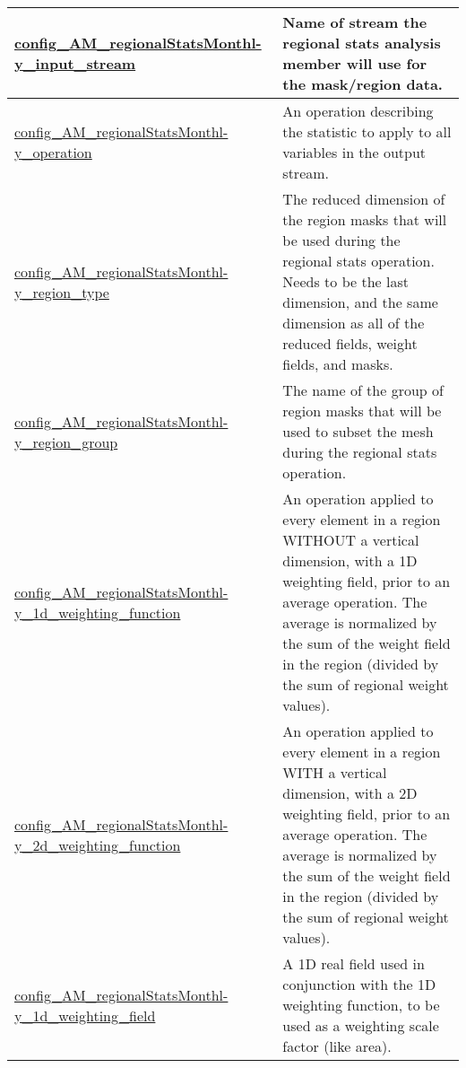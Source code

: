 {\begin{center}
\begin{longtable}{| p{2.0in} || p{4.0in} |}
    \hline
    \hyperref[subsec:nm_sec_config_AM_regionalStatsMonthly_input_stream]{config\_AM\_regionalStatsMonthl-}\hyperref[subsec:nm_sec_config_AM_regionalStatsMonthly_input_stream]{y\_input\_stream}& Name of stream the regional stats analysis member will use for the mask/region data. \\
    \hline
    \hyperref[subsec:nm_sec_config_AM_regionalStatsMonthly_operation]{config\_AM\_regionalStatsMonthl-}\hyperref[subsec:nm_sec_config_AM_regionalStatsMonthly_operation]{y\_operation}& An operation describing the statistic to apply to all variables in the output stream. \\
    \hline
    \hyperref[subsec:nm_sec_config_AM_regionalStatsMonthly_region_type]{config\_AM\_regionalStatsMonthl-}\hyperref[subsec:nm_sec_config_AM_regionalStatsMonthly_region_type]{y\_region\_type}& The reduced dimension of the region masks that will be used during the regional stats operation. Needs to be the last dimension, and the same dimension as all of the reduced fields, weight fields, and masks. \\
    \hline
    \hyperref[subsec:nm_sec_config_AM_regionalStatsMonthly_region_group]{config\_AM\_regionalStatsMonthl-}\hyperref[subsec:nm_sec_config_AM_regionalStatsMonthly_region_group]{y\_region\_group}& The name of the group of region masks that will be used to subset the mesh during the regional stats operation. \\
    \hline
    \hyperref[subsec:nm_sec_config_AM_regionalStatsMonthly_1d_weighting_function]{config\_AM\_regionalStatsMonthl-}\hyperref[subsec:nm_sec_config_AM_regionalStatsMonthly_1d_weighting_function]{y\_1d\_weighting\_function}& An operation applied to every element in a region WITHOUT a vertical dimension, with a 1D weighting field, prior to an average operation. The average is normalized by the sum of the weight field in the region (divided by the sum of regional weight values). \\
    \hline
    \hyperref[subsec:nm_sec_config_AM_regionalStatsMonthly_2d_weighting_function]{config\_AM\_regionalStatsMonthl-}\hyperref[subsec:nm_sec_config_AM_regionalStatsMonthly_2d_weighting_function]{y\_2d\_weighting\_function}& An operation applied to every element in a region WITH a vertical dimension, with a 2D weighting field, prior to an average operation. The average is normalized by the sum of the weight field in the region (divided by the sum of regional weight values). \\
    \hline
    \hyperref[subsec:nm_sec_config_AM_regionalStatsMonthly_1d_weighting_field]{config\_AM\_regionalStatsMonthl-}\hyperref[subsec:nm_sec_config_AM_regionalStatsMonthly_1d_weighting_field]{y\_1d\_weighting\_field}& A 1D real field used in conjunction with the 1D weighting function, to be used as a weighting scale factor (like area). \\

\end{longtable}
\end{center}}
